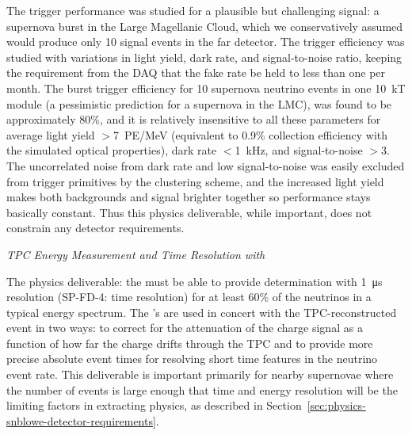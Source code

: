 
The  trigger performance was studied for a plausible but challenging signal: a supernova burst in the Large Magellanic Cloud, which we conservatively assumed would produce only 10 signal events in the far detector. The trigger efficiency was studied with variations in light yield, dark rate, and signal-to-noise ratio, keeping the requirement from the DAQ that the fake rate be held to less than one per month. The burst trigger efficiency for 10 supernova neutrino events in one \SI{10}{kT} module (a  pessimistic prediction for a supernova in the LMC), was found to be approximately $80\%$, and it is relatively insensitive to all these parameters for average light yield $>$\SI{7}{PE/MeV} (equivalent to 0.9\% collection efficiency with the simulated optical properties), dark rate $<$\SI{1}{kHz}, and signal-to-noise $>3$. The uncorrelated noise from dark rate and low signal-to-noise was easily excluded from trigger primitives by the clustering scheme, and the increased light yield makes both backgrounds and signal brighter together so performance stays basically constant. Thus this physics deliverable, while important, does not constrain any detector requirements.


\textit{TPC Energy Measurement and Time Resolution with \tzero}\nopagebreak


The physics deliverable: the  must be able to provide \tzero determination with \SI{1}{\micro s} resolution (SP-FD-4: time resolution) for at least 60\% of the neutrinos in a typical  energy spectrum. The \tzero's are used in concert with the TPC-reconstructed event in two ways: to correct for the attenuation of the charge signal as a function of how far the charge drifts through the TPC and to provide more precise absolute event times for resolving short time features in the  neutrino event rate. This deliverable is important primarily for nearby supernovae where the number of events is large enough that time and energy resolution will be the limiting factors in extracting physics, as described in Section~\ref{sec:physics-snblowe-detector-requirements}. 

